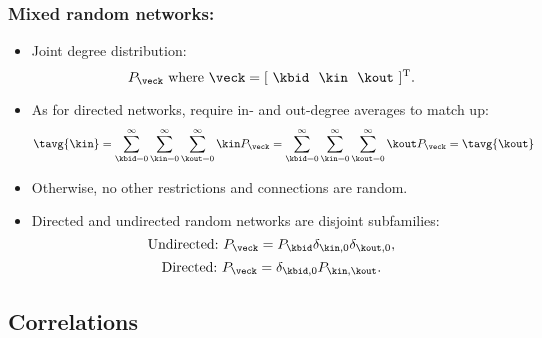 \begin{frame}
  \frametitle{Mixed random networks:}
  
  \begin{itemize}
  \item<1->
    Joint degree distribution:
    $$
    P_{\veck}
    \ \mbox{where} \
    \veck = [\ \kbid \ \  \kin \ \ \kout\ ]^{\textnormal{T}}.
    $$
  \item<2->
    As for directed networks, require in- and out-degree
    averages to match up:
        $$
    \tavg{\kin}
    =
    \sum_{\kbid=0}^\infty
    \sum_{\kin=0}^\infty
    \sum_{\kout=0}^\infty
    \kin
    P_{\veck}
    = 
    \sum_{\kbid=0}^\infty
    \sum_{\kin=0}^\infty
    \sum_{\kout=0}^\infty
    \kout
    P_{\veck}
    =
    \tavg{\kout}
    $$
  \item<3->
    Otherwise, no other restrictions and connections are random.
  \item<4->
    Directed and undirected random networks are disjoint subfamilies:
    $$
    \mbox{Undirected:} \
    P_{\veck}
    =
    P_{\kbid} \delta_{\kin,0} \delta_{\kout,0},
    $$
    $$
    \mbox{Directed:} \
    P_{\veck}
    =
    \delta_{\kbid,0} P_{\kin,\kout}.
    $$
  \end{itemize}
  
\end{frame}

\subsection{Correlations}

